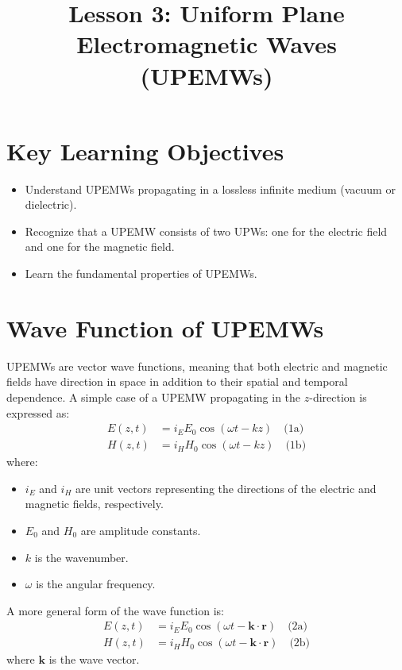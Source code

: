 \documentclass{article}
\title{Lesson 3: Uniform Plane Electromagnetic Waves (UPEMWs)}
\author{}
\date{}
\begin{document}
\maketitle

\section{Key Learning Objectives}
\begin{itemize}
    \item Understand UPEMWs propagating in a lossless infinite medium (vacuum or dielectric).
    \item Recognize that a UPEMW consists of two UPWs: one for the electric field and one for the magnetic field.
    \item Learn the fundamental properties of UPEMWs.
\end{itemize}

\section{Wave Function of UPEMWs}
UPEMWs are vector wave functions, meaning that both electric and magnetic fields have direction in space in addition to their spatial and temporal dependence. A simple case of a UPEMW propagating in the $z$-direction is expressed as:
\begin{align}
    E(z,t) &= i_E E_0 \cos(\omega t - kz) \quad \text{(1a)} \\
    H(z,t) &= i_H H_0 \cos(\omega t - kz) \quad \text{(1b)}
\end{align}
where:
\begin{itemize}
    \item $i_E$ and $i_H$ are unit vectors representing the directions of the electric and magnetic fields, respectively.
    \item $E_0$ and $H_0$ are amplitude constants.
    \item $k$ is the wavenumber.
    \item $\omega$ is the angular frequency.
\end{itemize}
A more general form of the wave function is:
\begin{align}
    E(z,t) &= i_E E_0 \cos(\omega t - \mathbf{k} \cdot \mathbf{r}) \quad \text{(2a)} \\
    H(z,t) &= i_H H_0 \cos(\omega t - \mathbf{k} \cdot \mathbf{r}) \quad \text{(2b)}
\end{align}
where $\mathbf{k}$ is the wave vector.
\end{document}
